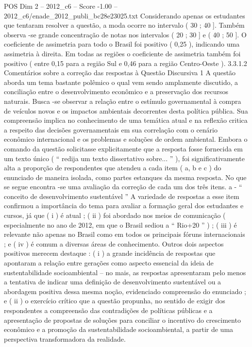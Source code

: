 \begin{textsample}{POS Dim 2 – 2012\_c6 – Score -1.00 – 2012\_c6/enade\_2012\_publi\_bc28e23025.txt}
Considerando apenas os estudantes que tentaram resolver a questão, a moda ocorre no intervalo ( 30 ; 40 ].
Também observa -se grande concentração de notas nos intervalos ( 20 ; 30 ] e ( 40 ; 50 ].
O coeficiente de assimetria para todo o Brasil foi positivo ( 0,25 ), indicando uma assimetria à direita.
Em todas as regiões o coeficiente de assimetria também foi positivo ( entre 0,15 para a região Sul e 0,46 para a região Centro-Oeste ). 3.3.1.2 Comentários sobre a correção das respostas à Questão Discursiva 1 A questão aborda um tema bastante polêmico o qual vem sendo amplamente discutido, a conciliação entre o desenvolvimento econômico e a preservação dos recursos naturais.
Busca -se observar a relação entre o estímulo governamental à compra de veículos novos e os impactos ambientais decorrentes desta política pública.
Sua compreensão implica no conhecimento de uma temática atual e na reflexão critica a respeito das decisões governamentais em sua correlação com o cenário econômico internacional e os problemas e soluções de ordem ambiental.
Embora o comando da questão solicitasse explicitamente que a resposta fosse fornecida em um texto único ( “ redija um texto dissertativo sobre... ” ), foi significativamente alta a proporção de respondentes que atendeu a cada item ( a, b e c ) do enunciado de maneira isolada, como partes estanques da mesma resposta.
No que se segue encontra -se uma avaliação da correção de cada um dos três itens. a - “ conceito de desenvolvimento sustentável ” A variedade de respostas a esse item confirmou a importância do tema para avaliar a formação geral dos estudantes e cursos, já que ( i ) é atual ; ( ii ) foi abordado nos meios de comunicação ( especialmente no ano de 2012, em que o Brasil sediou a “ Rio+20 ” ) ; ( iii ) é relevante não apenas no Brasil como em todos os principais fóruns internacionais ; e ( iv ) é comum a diversas áreas de conhecimento.
Outros dois aspectos positivos merecem destaque : ( i ) a grande incidência de respostas que apontaram a relação entre gerações como aspecto essencial da ideia de sustentabilidade socioambiental – no mais, as respostas apresentaram pelo menos a tentativa de indicar uma definição de desenvolvimento sustentável ou a abordagem positiva dessa mesma noção, evidenciado compreensão do enunciado ; e ( ii ) o exercício crítico que a questão propunha, no sentido de exigir dos respondentes a compreensão das contradições de políticas públicas e a apresentação de propostas de soluções para conciliar o incentivo do crescimento econômico e a promoção da sustentabilidade socioambiental, a partir de uma perspectiva transformadora da realidade.

\end{textsample}
